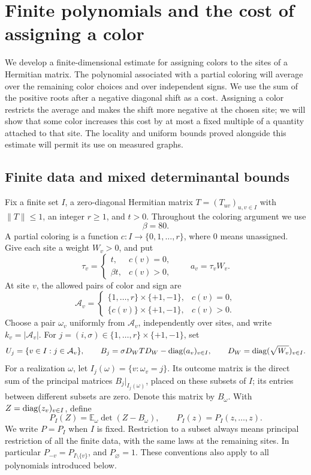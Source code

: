 \section{Finite polynomials and the cost of assigning a color}
\label{sec:polynomials}

We develop a finite-dimensional estimate for assigning colors to the sites of a
Hermitian matrix.  The polynomial associated with a partial coloring will
average over the remaining color choices and over independent signs.  We
use the sum of the positive roots after a negative diagonal shift as a cost.
Assigning a color restricts the average and makes the shift more negative at
the chosen site; we will show that some color increases this cost by at most
a fixed multiple of a quantity attached to that site.  The locality and uniform bounds proved
alongside this estimate will permit its use on measured graphs.

\subsection{Finite data and mixed determinantal bounds}

Fix a finite set \(I\), a zero-diagonal Hermitian matrix
\(T=(T_{uv})_{u,v\in I}\) with \(\|T\|\leq1\), an integer \(r\geq1\), and
\(t>0\).  Throughout the coloring argument we use
\[
                         \beta=80.
\]
A partial coloring is a function \(c:I\to\{0,1,\ldots,r\}\), where \(0\)
means unassigned.  Give each site a weight \(W_v>0\), and put
\[
 \tau_v=
 \begin{cases}
 t,&c(v)=0,\\
 \beta t,&c(v)>0,
 \end{cases}
 \qquad a_v=\tau_vW_v.
\]
At site \(v\), the allowed pairs of color and sign are
\[
 \mathcal A_v=
 \begin{cases}
 \{1,\ldots,r\}\times\{+1,-1\},&c(v)=0,\\
 \{c(v)\}\times\{+1,-1\},&c(v)>0.
 \end{cases}
\]
Choose a pair \(\omega_v\) uniformly from \(\mathcal A_v\), independently
over sites, and write \(k_v=|\mathcal A_v|\).  For
\(j=(i,\sigma)\in\{1,\ldots,r\}\times\{+1,-1\}\), set
\[
 U_j=\{v\in I:j\in\mathcal A_v\},\qquad
 B_j=\sigma D_W T D_W-\operatorname{diag}(a_v)_{v\in I},
 \qquad D_W=\operatorname{diag}(\sqrt{W_v})_{v\in I}.
\]
For a realization \(\omega\), let \(I_j(\omega)=\{v:\omega_v=j\}\).
Its outcome matrix is the direct sum of the principal matrices
\(B_j|_{I_j(\omega)}\), placed on these subsets of \(I\); its entries
between different subsets are zero.  Denote this matrix by \(B_\omega\).
With \(Z=\operatorname{diag}(z_v)_{v\in I}\), define
\begin{equation}
 P_I(Z)=\mathbb E_\omega\det(Z-B_\omega),\qquad
 P_I(z)=P_I(z,\ldots,z).
 \label{eq:poly-definition}
\end{equation}
We write \(P=P_I\) when \(I\) is fixed.  Restriction to a subset always
means principal restriction of all the finite data, with the same laws at
the remaining sites.  In particular \(P_{-v}=P_{I\setminus\{v\}}\), and
\(P_\varnothing=1\).  These conventions also apply to all polynomials
introduced below.

